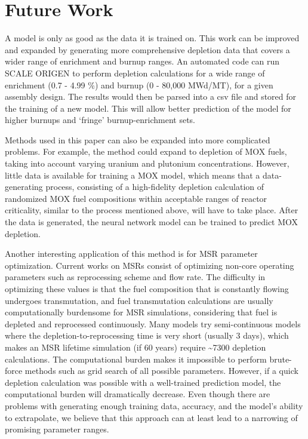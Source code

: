 \section{Future Work}

A model is only as good as the data it is trained on.
This work can be improved and expanded by generating
more comprehensive depletion data that covers a wider
range of enrichment and burnup ranges. An automated
code can run SCALE ORIGEN to perform depletion calculations
for a wide range of enrichment (0.7 - 4.99 \%) and burnup (0 - 80,000 MWd/MT),
for a given assembly design. The results
would then be parsed into a csv file and stored for
the training of a new model. This will allow better
prediction of the model for higher burnups and `fringe'
burnup-enrichment sets.

Methods used in this paper can also be expanded into more
complicated problems. For example, the method
could expand to depletion of \gls{MOX} fuels, taking
into account varying uranium and plutonium concentrations.
However, little data is available
for training a \gls{MOX} model, which means that a
data-generating process, consisting of a high-fidelity
depletion calculation of randomized \gls{MOX} fuel
compositions within acceptable ranges of reactor
criticality, similar to the process mentioned above,
will have to take place. After the data
is generated, the neural network model can be trained
to predict \gls{MOX} depletion.

Another interesting application of this method is for
\gls{MSR} parameter optimization. Current works on
\glspl{MSR} consist of optimizing non-core operating
parameters such as reprocessing scheme and flow rate.
The difficulty in optimizing these values is that the
fuel composition that is constantly flowing undergoes
transmutation, and fuel transmutation calculations
are usually computationally burdensome for \gls{MSR}
simulations, considering that fuel is depleted and
reprocessed continuously. Many models try semi-continuous
models where the depletion-to-reprocessing time is
very short (usually 3 days), which makes an
\gls{MSR} lifetime simulation (if 60 years)
require \textasciitilde 7300 depletion calculations.
The computational burden
makes it impossible to perform brute-force methods
such as grid search of all possible parameters.
However, if a quick depletion calculation was possible
with a well-trained prediction model, the
computational burden will dramatically decrease.
Even though there are problems with generating enough
training data, accuracy, and the model's ability to
extrapolate, we believe that this approach can
at least lead to a narrowing of promising parameter
ranges.